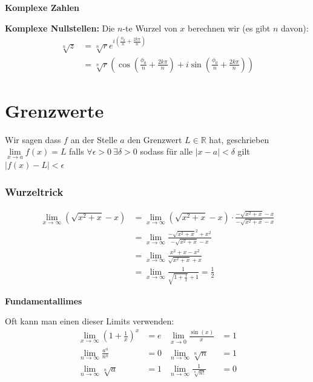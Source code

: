 \documentclass[25pt]{sciposter}
\newcommand{\R}{\mathbb{R}}
\newenvironment{method}[1]{\begin{mdframed}[backgroundcolor=blue!10,innertopmargin=15pt, innerbottommargin=15pt, nobreak=true]
		\textbf{#1 }
	}
	{ 
	\end{mdframed}
}
\begin{document}
\begin{multicols}{3}
\begin{method}{Komplexe Zahlen}
\textbf{Komplexe Nullstellen:} Die $n$-te Wurzel von $x$ berechnen wir (es gibt $n$ davon):
\begin{align*}
	\sqrt[n]{z} &= \sqrt[n]{r} e^{i \left( \frac{\phi_0}{n} + \frac{2k\pi}{n}\right)}\\
	&= \sqrt[n]{r} \left(\cos\left( \frac{\phi_0}{n} + \frac{2k\pi}{n}\right) + i \sin\left( \frac{\phi_0}{n} + \frac{2k\pi}{n}\right)\right)
\end{align*}

\end{method}





\section*{Grenzwerte}
Wir sagen dass $f$ an der Stelle $a$ den Grenzwert $L\in \R$ hat, geschrieben $\lim\limits_{x \to a} f(x) = L$ falls $\forall \epsilon > 0 \ \exists \delta > 0 $ sodass für alle $|x-a|<\delta$ gilt $|f(x)-L|< \epsilon$




\subsubsection*{Wurzeltrick}
\begin{align*}
	\lim\limits_{x \to \infty } \left( \sqrt{x^2 + x} -x \right) &= \lim\limits_{x \to \infty } \left( \sqrt{x^2 + x} -x \right)  \cdot \frac{  -\sqrt{x^2 + x} -x  }{ -\sqrt{x^2 + x} -x }\\
	&= 	\lim\limits_{x \to \infty } \frac{- \sqrt{x^2 + x} ^2 + x^2}{ -\sqrt{x^2 + x} -x}\\
	&= 	\lim\limits_{x \to \infty } \frac{x^2 + x - x^2}{ \sqrt{x^2 + x} +x}\\
	&=  \lim\limits_{x \to \infty}  \frac{1}{\sqrt{1 + \frac{1}{x}} + 1} = \frac{1}{2}
\end{align*}



\begin{method}{Fundamentallimes}
	Oft kann man einen dieser Limits verwenden:
	\begin{align*}
		\lim\limits_{x \to \infty} \left(1 + \frac{1}{x}\right)^x &= e &  \lim\limits_{x \to 0} \frac{\sin(x)}{x} &= 1 \\
		\lim\limits_{n \to \infty} \frac{a^n}{n^n} &= 0 & 	\lim\limits_{n \to \infty} \sqrt[n]{n} &= 1\\
		\lim\limits_{n \to \infty} \sqrt[n]{a} &= 1  & 	\lim\limits_{n \to \infty} \frac{1}{\sqrt[n]{n!}} &= 0
	\end{align*}
\end{method}



\end{multicols}
\end{document}
